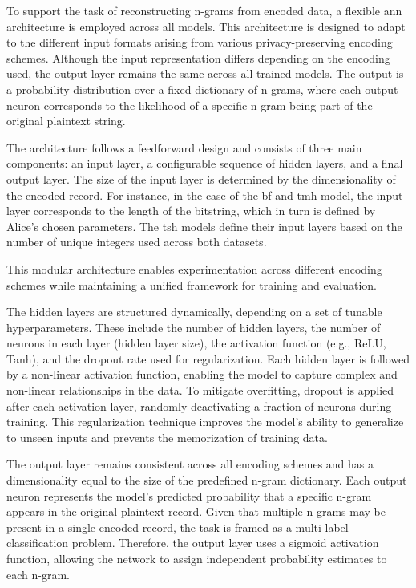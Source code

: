 To support the task of reconstructing n-grams from encoded data, a flexible \ac{ann} architecture is employed across all models.
This architecture is designed to adapt to the different input formats arising from various privacy-preserving encoding schemes.
Although the input representation differs depending on the encoding used, the output layer remains the same across all trained models.
The output is a probability distribution over a fixed dictionary of n-grams, where each output neuron corresponds to the likelihood of a specific n-gram being part of the original plaintext string.

The architecture follows a feedforward design and consists of three main components: an input layer, a configurable sequence of hidden layers, and a final output layer.
The size of the input layer is determined by the dimensionality of the encoded record.
For instance, in the case of the \ac{bf} and \ac{tmh} model, the input layer corresponds to the length of the bitstring, which in turn is defined by Alice’s chosen parameters.
The \ac{tsh} models define their input layers based on the number of unique integers used across both datasets.

This modular architecture enables experimentation across different encoding schemes while maintaining a unified framework for training and evaluation.

The hidden layers are structured dynamically, depending on a set of tunable hyperparameters.
These include the number of hidden layers, the number of neurons in each layer (hidden layer size), the activation function (e.g., ReLU, Tanh), and the dropout rate used for regularization.
Each hidden layer is followed by a non-linear activation function, enabling the model to capture complex and non-linear relationships in the data.
To mitigate overfitting, dropout is applied after each activation layer, randomly deactivating a fraction of neurons during training.
This regularization technique improves the model's ability to generalize to unseen inputs and prevents the memorization of training data.

The output layer remains consistent across all encoding schemes and has a dimensionality equal to the size of the predefined n-gram dictionary.
Each output neuron represents the model's predicted probability that a specific n-gram appears in the original plaintext record.
Given that multiple n-grams may be present in a single encoded record, the task is framed as a multi-label classification problem.
Therefore, the output layer uses a sigmoid activation function, allowing the network to assign independent probability estimates to each n-gram.

